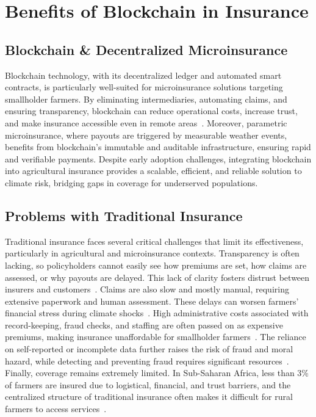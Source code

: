 \documentclass[11pt,a4paper]{article}
\begin{document}
    \section{Benefits of Blockchain in Insurance}\label{sec:benefits}

    \subsection{Blockchain \& Decentralized Microinsurance}\label{subsec:blockchain-&-decentralized-microinsurance}
    Blockchain technology, with its decentralized ledger and automated smart contracts, is particularly well-suited for microinsurance solutions targeting smallholder farmers.
    By eliminating intermediaries, automating claims, and ensuring transparency, blockchain can reduce operational costs, increase trust, and make insurance accessible even in remote areas~\parencite{DominguezAnguianoParte2024, Shetty2022}.
    Moreover, parametric microinsurance, where payouts are triggered by measurable weather events, benefits from blockchain's immutable and auditable infrastructure, ensuring rapid and verifiable payments.
    Despite early adoption challenges, integrating blockchain into agricultural insurance provides a scalable, efficient, and reliable solution to climate risk, bridging gaps in coverage for underserved populations.

    \subsection{Problems with Traditional Insurance}\label{subsec:problems-with-traditional-insurance}
    Traditional insurance faces several critical challenges that limit its effectiveness, particularly in agricultural and microinsurance contexts.
    Transparency is often lacking, so policyholders cannot easily see how premiums are set, how claims are assessed, or why payouts are delayed.
    This lack of clarity fosters distrust between insurers and customers~\parencite{DominguezAnguianoParte2024}.
    Claims are also slow and mostly manual, requiring extensive paperwork and human assessment.
    These delays can worsen farmers' financial stress during climate shocks~\parencite{Chainlink2021, Shetty2022}.
    High administrative costs associated with record-keeping, fraud checks, and staffing are often passed on as expensive premiums, making insurance unaffordable for smallholder farmers~\parencite{DominguezAnguianoParte2024}.
    The reliance on self-reported or incomplete data further raises the risk of fraud and moral hazard, while detecting and preventing fraud requires significant resources~\parencite{Chainlink2021, Shetty2022}.
    Finally, coverage remains extremely limited.
    In Sub-Saharan Africa, less than 3\% of farmers are insured due to logistical, financial, and trust barriers, and the centralized structure of traditional insurance often makes it difficult for rural farmers to access services~\parencite{Alsdorf2024, WorldBank2022}.
\end{document}
